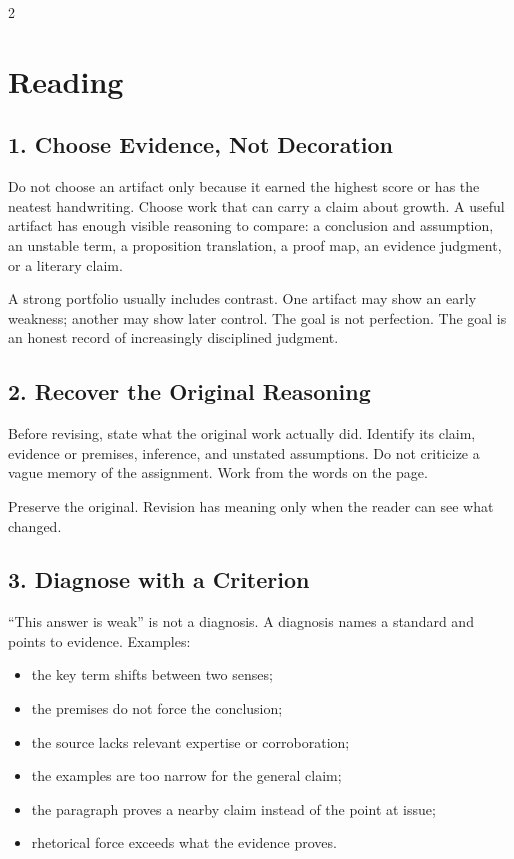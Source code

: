 \documentclass[12pt]{article}
\begin{document}
\begin{multicols}{2}
\section*{Reading}

\subsection*{1. Choose Evidence, Not Decoration}
Do not choose an artifact only because it earned the highest score or has the neatest handwriting. Choose work that can carry a claim about growth. A useful artifact has enough visible reasoning to compare: a conclusion and assumption, an unstable term, a proposition translation, a proof map, an evidence judgment, or a literary claim.

A strong portfolio usually includes contrast. One artifact may show an early weakness; another may show later control. The goal is not perfection. The goal is an honest record of increasingly disciplined judgment.

\subsection*{2. Recover the Original Reasoning}
Before revising, state what the original work actually did. Identify its claim, evidence or premises, inference, and unstated assumptions. Do not criticize a vague memory of the assignment. Work from the words on the page.

Preserve the original. Revision has meaning only when the reader can see what changed.

\subsection*{3. Diagnose with a Criterion}
``This answer is weak'' is not a diagnosis. A diagnosis names a standard and points to evidence. Examples:

\begin{itemize}[leftmargin=*]
\item the key term shifts between two senses;
\item the premises do not force the conclusion;
\item the source lacks relevant expertise or corroboration;
\item the examples are too narrow for the general claim;
\item the paragraph proves a nearby claim instead of the point at issue;
\item rhetorical force exceeds what the evidence proves.
\end{itemize}


\end{multicols}
\end{document}
